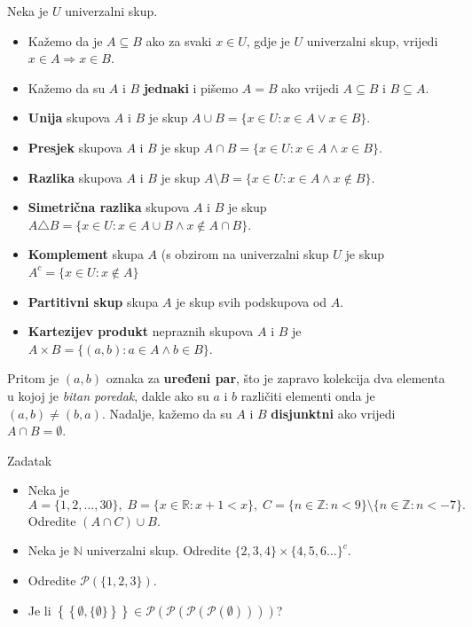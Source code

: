\begin{definition} Neka je \(U\) univerzalni skup.
\label{aboutsets}
\begin{itemize}
\item Kažemo da je \(A\subseteq B\) ako za svaki \(x\in U\), gdje je \(U\) univerzalni skup, vrijedi \(x\in A\Rightarrow x\in B\).
\item Kažemo da su \(A\) i \(B\) \textbf{jednaki} i pišemo \(A=B\) ako vrijedi \(A\subseteq B\) i \(B\subseteq A\).
\item \textbf{Unija} skupova \(A\) i \(B\) je skup \(A\cup B=\{x\in U : x\in A\vee x\in B\}\).
\item \textbf{Presjek} skupova \(A\) i \(B\) je skup \(A\cap B=\{x\in U : x\in A\wedge x\in B\}\).
\item \textbf{Razlika} skupova \(A\) i \(B\) je skup \(A\setminus B=\{x\in U : x\in A\wedge x\notin B\}\).
\item \textbf{Simetrična razlika} skupova \(A\) i \(B\) je skup \(A\triangle B=\{x\in U : x\in A\cup B \wedge x\notin A\cap B\}\).
\item \textbf{Komplement} skupa \(A\) (s obzirom na univerzalni skup \(U\) je skup \(A^c=\{x\in U : x\notin A\}\)
\item \textbf{Partitivni skup} skupa \(A\) je skup svih podskupova od \(A\).
\item \textbf{Kartezijev produkt} nepraznih skupova \(A\) i \(B\) je \(A\times B=\{(a, b) : a\in A \wedge b\in B\}\).
\end{itemize}
Pritom je \((a, b)\) oznaka za \textbf{uređeni par}, što je zapravo kolekcija dva elementa u kojoj je \textit{bitan poredak}, dakle ako su \(a\) i \(b\) različiti elementi onda je \((a, b)\neq (b, a)\). Nadalje, kažemo da su \(A\) i \(B\) \textbf{disjunktni} ako vrijedi \(A\cap B=\emptyset\).
\end{definition}
\begin{exercise}{Zadatak} \textbf{}
\begin{itemize}
\item[a)] Neka je \[A=\{1, 2, \dots, 30\},\; B=\{x\in \mathbb{R} : x+1<x\},\; C=\{n\in \mathbb{Z} : n<9\}\setminus\{n \in \mathbb{Z} : n<-7\}.\] 
Odredite \((A\cap C)\cup B\).
\item[b)] Neka je \(\mathbb{N}\) univerzalni skup. Odredite \(\{2, 3, 4\}\times \{4, 5, 6 \dots\}^c\).
\item[c)] Odredite \(\mathcal{P}\left(\{1, 2, 3\}\right)\).
\item[d)] Je li \(\left\{\left\{\emptyset, \{\emptyset\}\right\}\right\} \in \mathcal{P}\left(\mathcal{P}\left(\mathcal{P}\left(\mathcal{P}\left(\emptyset\right)\right)\right)\right)\)?
\end{itemize}
\end{exercise}
